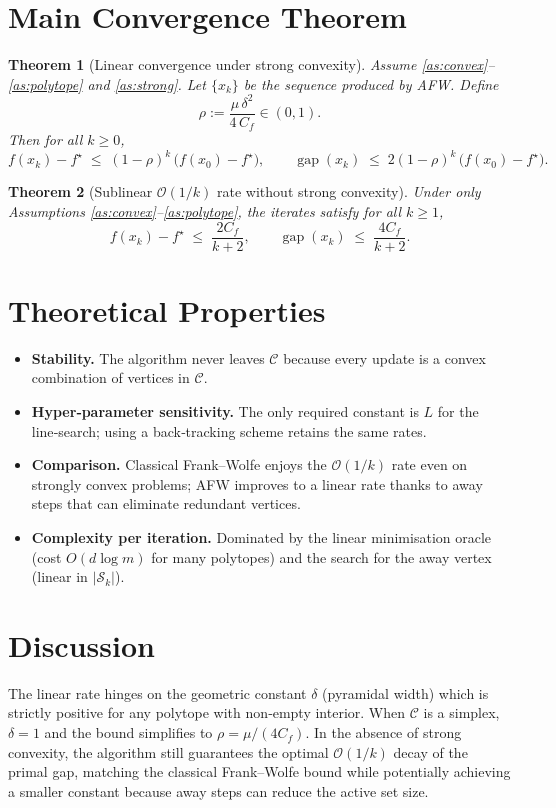 \documentclass{article}
\newtheorem{theorem}{Theorem}
\newcommand{\C}{\mathcal{C}}
\newcommand{\gap}{\operatorname{gap}}
\begin{document}
\section*{Main Convergence Theorem}
\begin{theorem}[Linear convergence under strong convexity]\label{thm:linear}
Assume \ref{as:convex}–\ref{as:polytope} and \ref{as:strong}. Let $\{x_{k}\}$ be the sequence produced by AFW.
Define
\[
\rho:=\frac{\mu\,\delta^{2}}{4\,C_{f}}\in(0,1).
\]
Then for all $k\ge 0$,
\[
f(x_{k})-f^{\star}\;\le\;(1-\rho)^{k}\,\bigl(f(x_{0})-f^{\star}\bigr),
\qquad 
\gap(x_{k})\;\le\;2(1-\rho)^{k}\,\bigl(f(x_{0})-f^{\star}\bigr).
\]
\end{theorem}
\begin{theorem}[Sublinear $\mathcal{O}(1/k)$ rate without strong convexity]\label{thm:sublinear}
Under only Assumptions \ref{as:convex}–\ref{as:polytope},
the iterates satisfy for all $k\ge 1$,
\[
f(x_{k})-f^{\star}\;\le\;\frac{2C_{f}}{k+2},
\qquad
\gap(x_{k})\;\le\;\frac{4C_{f}}{k+2}.
\]
\end{theorem}

\section*{Theoretical Properties}
\begin{itemize}
\item \textbf{Stability.} The algorithm never leaves $\C$ because every update is a convex combination of vertices in $\C$.
\item \textbf{Hyper‑parameter sensitivity.} The only required constant is $L$ for the line‑search; using a back‑tracking scheme retains the same rates.
\item \textbf{Comparison.} Classical Frank–Wolfe enjoys the $\mathcal{O}(1/k)$ rate even on strongly convex problems; AFW improves to a linear rate thanks to away steps that can eliminate redundant vertices.
\item \textbf{Complexity per iteration.} Dominated by the linear minimisation oracle (cost $O(d\log m)$ for many polytopes) and the search for the away vertex (linear in $|\mathcal{S}_{k}|$).
\end{itemize}

\section*{Discussion}
The linear rate hinges on the geometric constant $\delta$ (pyramidal width) which is strictly positive for any polytope with non‑empty interior. When $\C$ is a simplex, $\delta=1$ and the bound simplifies to $\rho=\mu/(4C_{f})$. In the absence of strong convexity, the algorithm still guarantees the optimal $\mathcal{O}(1/k)$ decay of the primal gap, matching the classical Frank–Wolfe bound while potentially achieving a smaller constant because away steps can reduce the active set size.
\end{document}
